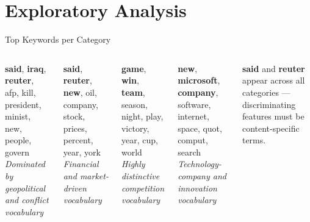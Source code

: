 \documentclass[aspectratio=169,11pt]{beamer}
\begin{document}
\section{Exploratory Analysis}

\begin{frame}{Top Keywords per Category}
  \vspace{-0.45cm}
\begin{columns}[T]
    \begin{tcolorbox}[colback=worldcol!8,colframe=worldcol,title=World --- Top Terms,fonttitle=\footnotesize\bfseries]
      \footnotesize
      \textbf{said}, \textbf{iraq}, \textbf{reuter}, afp, kill, president, minist, new, people, govern\\[3pt]
      \textit{\scriptsize Dominated by geopolitical and conflict vocabulary}
    \end{tcolorbox}
    \vspace{4pt}
    \begin{tcolorbox}[colback=businesscol!8,colframe=businesscol,title=Business --- Top Terms,fonttitle=\footnotesize\bfseries]
      \footnotesize
      \textbf{said}, \textbf{reuter}, \textbf{new}, oil, company, stock, prices, percent, year, york\\[3pt]
      \textit{\scriptsize Financial and market-driven vocabulary}
    \end{tcolorbox}
    \begin{tcolorbox}[colback=sportscol!8,colframe=sportscol,title=Sports --- Top Terms,fonttitle=\footnotesize\bfseries]
      \footnotesize
      \textbf{game}, \textbf{win}, \textbf{team}, season, night, play, victory, year, cup, world\\[3pt]
      \textit{\scriptsize Highly distinctive competition vocabulary}
    \end{tcolorbox}
    \vspace{4pt}
    \begin{tcolorbox}[colback=scitechcol!8,colframe=scitechcol,title=Sci/Tech --- Top Terms,fonttitle=\footnotesize\bfseries]
      \footnotesize
      \textbf{new}, \textbf{microsoft}, \textbf{company}, software, internet, space, quot, comput, search\\[3pt]
      \textit{\scriptsize Technology-company and innovation vocabulary}
    \end{tcolorbox}
    \vspace{-6pt}
    \begin{tcolorbox}[colback=accent!8,colframe=accent,fonttitle=\footnotesize\bfseries,title=Key Observation]
      \scriptsize
      \textbf{said} and \textbf{reuter} appear across all categories --- discriminating features must be content-specific terms.
    \end{tcolorbox}
\end{columns}
\end{frame}
\end{document}
